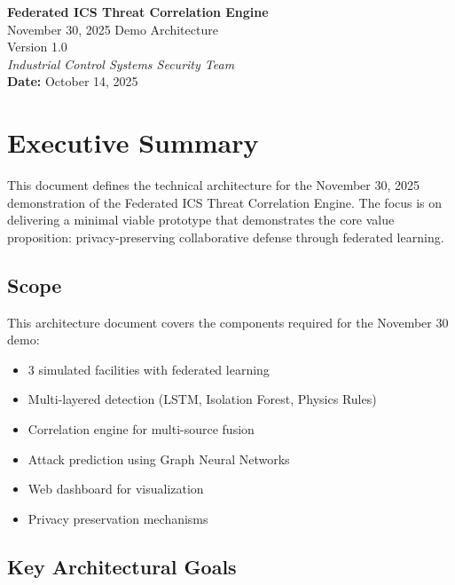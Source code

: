 \documentclass[12pt,a4paper]{article}
\begin{document}
\begin{center}
    \vspace*{0.5cm}
    {\Huge \textbf{Federated ICS Threat Correlation Engine}}\\[0.4cm]
    {\LARGE November 30, 2025 Demo Architecture}\\[0.3cm]
    {\large Version 1.0}\\[0.2cm]
    \textit{Industrial Control Systems Security Team}\\[0.1cm]
    \textbf{Date:} October 14, 2025\\
    \vspace{0.5cm}
\end{center}

\tableofcontents
\newpage

\section{Executive Summary}

This document defines the technical architecture for the November 30, 2025 demonstration of the Federated ICS Threat Correlation Engine.
The focus is on delivering a minimal viable prototype that demonstrates the core value proposition: privacy-preserving collaborative defense through federated learning.

\subsection{Scope}

This architecture document covers the components required for the November 30 demo:

\begin{itemize}[leftmargin=1cm,itemsep=0pt]
    \item 3 simulated facilities with federated learning
    \item Multi-layered detection (LSTM, Isolation Forest, Physics Rules)
    \item Correlation engine for multi-source fusion
    \item Attack prediction using Graph Neural Networks
    \item Web dashboard for visualization
    \item Privacy preservation mechanisms
\end{itemize}


\subsection{Key Architectural Goals}
\end{document}
